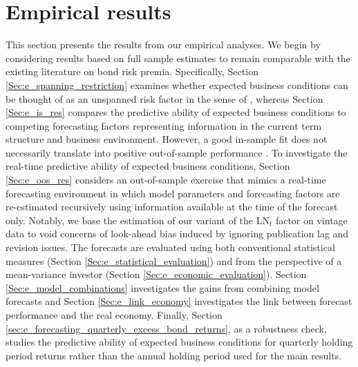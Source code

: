 \documentclass[12pt,letterpaper,leqno,doublespacing]{article}
\begin{document}
\section{Empirical results}\label{Sec:e_empirical_results}
This section presents the results from our empirical analyses. We begin by considering results based on full sample estimates to remain comparable with the existing literature on bond risk premia. Specifically, Section \ref{Sec:e_spanning_restriction} examines whether expected business conditions can be thought of as an unspanned risk factor in the sense of \cite{JoslinPriebschSingleton2014}, whereas Section \ref{Sec:e_is_res} compares the predictive ability of expected business conditions to competing forecasting factors representing information in the current term structure and business environment. However, a good in-sample fit does not necessarily translate into positive out-of-sample performance \citep{InoueKilian2005,ThorntonValente2012}. To investigate the real-time predictive ability of expected business conditions, Section \ref{Sec:e_oos_res} considers an out-of-sample exercise that mimics a real-time forecasting environment in which model parameters and forecasting factors are re-estimated recursively using information available at the time of the forecast only. Notably, we base the estimation of our variant of the LN$_{t}$ factor on vintage data to void concerns of look-ahead bias induced by ignoring publication lag and revision issues. The forecasts are evaluated using both conventional statistical measures (Section \ref{Sec:e_statistical_evaluation}) and from the perspective of a mean-variance investor (Section \ref{Sec:e_economic_evaluation}). Section \ref{Sec:e_model_combinations} investigates the gains from combining model forecasts and Section \ref{Sec:e_link_economy} investigates the link between forecast performance and the real economy. Finally, Section \ref{sec:e_forecasting_quarterly_excess_bond_returns}, as a robustness check, studies the predictive ability of expected business conditions for quarterly holding period returns rather than the annual holding period used for the main results.  

\end{document}
